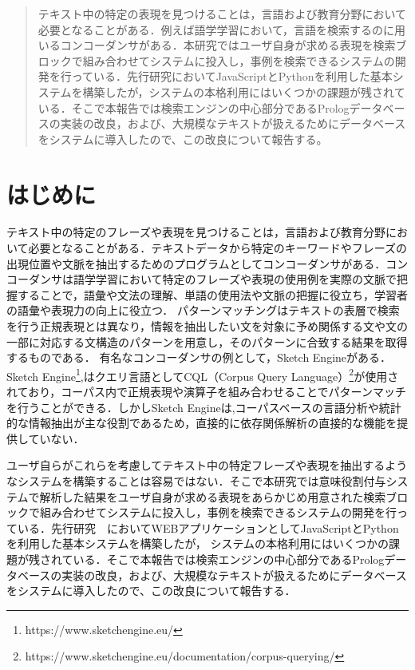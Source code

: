 \documentclass{FITpaper}
\begin{document}
\maketitle
\begin{abstract}
  テキスト中の特定の表現を見つけることは，言語および教育分野において必要となることがある．例えば語学学習において，言語を検索するのに用いるコンコーダンサがある．本研究ではユーザ自身が求める表現を検索ブロックで組み合わせてシステムに投入し，事例を検索できるシステムの開発を行っている．先行研究においてJavaScriptとPythonを利用した基本システムを構築したが，システムの本格利用にはいくつかの課題が残されている．そこで本報告では検索エンジンの中心部分であるPrologデータベースの実装の改良，および、大規模なテキストが扱えるためにデータベースをシステムに導入したので、この改良について報告する。 
\end{abstract}
\section{はじめに}
テキスト中の特定のフレーズや表現を見つけることは，言語および教育分野において必要となることがある．テキストデータから特定のキーワードやフレーズの出現位置や文脈を抽出するためのプログラムとしてコンコーダンサがある．コンコーダンサは語学学習において特定のフレーズや表現の使用例を実際の文脈で把握することで，語彙や文法の理解、単語の使用法や文脈の把握に役立ち，学習者の語彙や表現力の向上に役立つ．
パターンマッチングはテキストの表層で検索を行う正規表現とは異なり，情報を抽出したい文を対象に予め関係する文や文の一部に対応する文構造のパターンを用意し，そのパターンに合致する結果を取得するものである．
有名なコンコーダンサの例として，Sketch Engineがある．Sketch Engine\footnote{https://www.sketchengine.eu/},はクエリ言語としてCQL（Corpus Query Language）\footnote{https://www.sketchengine.eu/documentation/corpus-querying/}が使用されており，コーパス内で正規表現や演算子を組み合わせることでパターンマッチを行うことができる．しかしSketch Engineは,コーパスベースの言語分析や統計的な情報抽出が主な役割であるため，直接的に依存関係解析の直接的な機能を提供していない．

ユーザ自らがこれらを考慮してテキスト中の特定フレーズや表現を抽出するようなシステムを構築することは容易ではない．そこで本研究では意味役割付与システムで解析した結果をユーザ自身が求める表現をあらかじめ用意された検索ブロックで組み合わせてシステムに投入し，事例を検索できるシステムの開発を行っている．先行研究　においてWEBアプリケーションとしてJavaScriptとPythonを利用した基本システムを構築したが，
システムの本格利用にはいくつかの課題が残されている．そこで本報告では検索エンジンの中心部分であるPrologデータベースの実装の改良，および、大規模なテキストが扱えるためにデータベースをシステムに導入したので、この改良について報告する．
\end{document}
